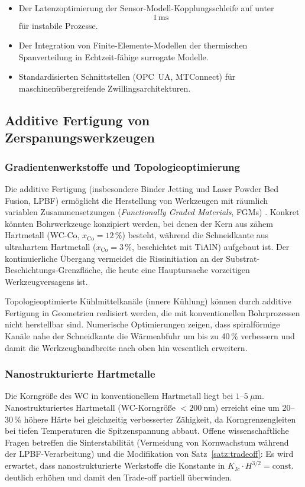 ﻿\documentclass[a4paper,12pt]{article}
\theoremstyle{definition}
\begin{document}
\begin{itemize}
  \item Der Latenzoptimierung der Sensor-Modell-Kopplungsschleife auf
        unter $$1\,\mathrm{ms}$$ für instabile Prozesse.
  \item Der Integration von Finite-Elemente-Modellen der thermischen
        Spanverteilung in Echtzeit-fähige surrogate Modelle.
  \item Standardisierten Schnittstellen (OPC~UA, MTConnect) für
        maschinenübergreifende Zwillingsarchitekturen.
\end{itemize}

\subsection{Additive Fertigung von Zerspanungswerkzeugen}

\subsubsection{Gradientenwerkstoffe und Topologieoptimierung}

Die additive Fertigung (insbesondere Binder Jetting und Laser Powder Bed
Fusion, LPBF) ermöglicht die Herstellung von Werkzeugen mit räumlich variablen
Zusammensetzungen (\emph{Functionally Graded Materials}, FGMs) \cite{yan2017}.
Konkret könnten Bohrwerkzeuge konzipiert werden, bei denen der Kern aus
zähem Hartmetall (WC-Co, $x_{\text{Co}} = 12\,\%$) besteht, während die
Schneidkante aus ultrahartem Hartmetall ($x_{\text{Co}} = 3\,\%$, beschichtet
mit TiAlN) aufgebaut ist. Der kontinuierliche Übergang vermeidet die Rissinitiation
an der Substrat-Beschichtungs-Grenzfläche, die heute eine Hauptursache
vorzeitigen Werkzeugversagens ist.

Topologieoptimierte Kühlmittelkanäle (innere Kühlung) können durch additive
Fertigung in Geometrien realisiert werden, die mit konventionellen Bohrprozessen
nicht herstellbar sind. Numerische Optimierungen zeigen, dass spiralförmige
Kanäle nahe der Schneidkante die Wärmeabfuhr um bis zu 40\,\% verbessern
\cite{bier2020} und damit die Werkzeugbandbreite nach oben hin wesentlich
erweitern.

\subsubsection{Nanostrukturierte Hartmetalle}

Die Korngröße des WC in konventionellem Hartmetall liegt bei $1\text{--}5~\mu\text{m}$.
Nanostrukturiertes Hartmetall (WC-Korngröße $< 200~\text{nm}$) erreicht eine
um 20--30\,\% höhere Härte bei gleichzeitig verbesserter Zähigkeit, da
Korngrenzengleiten bei tiefen Temperaturen die Spitzenspannung abbaut.
Offene wissenschaftliche Fragen betreffen die Sinterstabilität (Vermeidung
von Kornwachstum während der LPBF-Verarbeitung) und die Modifikation von
Satz~\ref{satz:tradeoff}: Es wird erwartet, dass nanostrukturierte Werkstoffe
die Konstante in $K_{Ic} \cdot H^{3/2} = \text{const.}$ deutlich erhöhen
und damit den Trade-off partiell überwinden.
\end{document}
